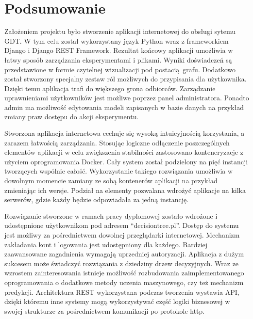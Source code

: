 \chapter*{Podsumowanie}
Założeniem projektu było stworzenie aplikacji internetowej do obsługi sytemu GDT. W tym celu został wykorzystany język Python wraz z frameworkiem Django i Django REST Framework. Rezultat końcowy aplikacji umożliwia w łatwy sposób zarządzania eksperymentami i plikami. Wyniki doświadczeń są przedstawione w formie czytelnej wizualizacji pod postacią grafu. Dodatkowo został stworzony specjalny zestaw ról możliwych do przypisania dla użytkownika. Dzięki temu aplikacja trafi do większego grona odbiorców. Zarządzanie uprawnieniami użytkowników jest możliwe poprzez panel administratora. Ponadto admin ma możliwość edytowania modeli zapisanych w bazie danych na przykład zmiany praw dostępu do akcji eksperymentu. 

Stworzona aplikacja internetowa cechuje się wysoką intuicyjnością korzystania, a zarazem łatwością zarządzania. Stosując logiczne odłączenie poszczególnych elementów aplikacji w celu zwiększenia stabilności zastosowano konteneryzacje z użyciem oprogramowania Docker. Cały system został podzielony na pięć instancji tworzących wspólnie całość. Wykorzystanie takiego rozwiązania umożliwia w dowolnym momencie zamiany ze sobą kontenerów aplikacji na przykład zmieniając ich wersje. Podział na elementy pozwalana wdrożyć aplikacje na kilka serwerów, gdzie każdy będzie odpowiadała za jedną instancję. 

Rozwiązanie stworzone w ramach pracy dyplomowej zostało wdrożone i udostępnione użytkownikom pod adresem \enquote{decisiontree.pl}. Dostęp do systemu jest możliwy za pośrednictwem dowolnej przeglądarki internetowej. Mechanizm zakładania kont i logowania jest udostępniony dla każdego. Bardziej zaawansowane zagadnienia wymagają uprzedniej autoryzacji. Aplikacja z dużym sukcesem może świadczyć rozwiązania z dziedziny drzew decyzyjnych. Wraz ze wzrostem zainteresowania istnieje możliwość rozbudowania zaimplementowanego oprogramowania o dodatkowe metody uczenia maszynowego, czy też mechanizm predykcji. Architektura REST wykorzystana podczas tworzenia wystawia API, dzięki któremu inne systemy mogą wykorzystywać część logiki biznesowej w swojej strukturze za pośrednictwem komunikacji po protokole http.